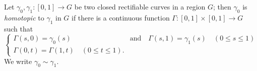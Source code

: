 Let $\gamma_0, \gamma_1 : [0, 1] \to G$ be two closed rectifiable curves in a region $G$; then $\gamma_0$ is \textit{homotopic} to $\gamma_1$ in $G$ if there is a continuous function $\Gamma : [0, 1] \times [0, 1] \to G$ such that
$$
\begin{cases}
\Gamma(s, 0) = \gamma_0(s) & \text{and} \quad \Gamma(s, 1) = \gamma_1(s) \quad (0 \leq s \leq 1) \\
\Gamma(0, t) = \Gamma(1, t) \quad (0 \leq t \leq 1).
\end{cases}
$$
We write $\gamma_0 \sim \gamma_1$.
